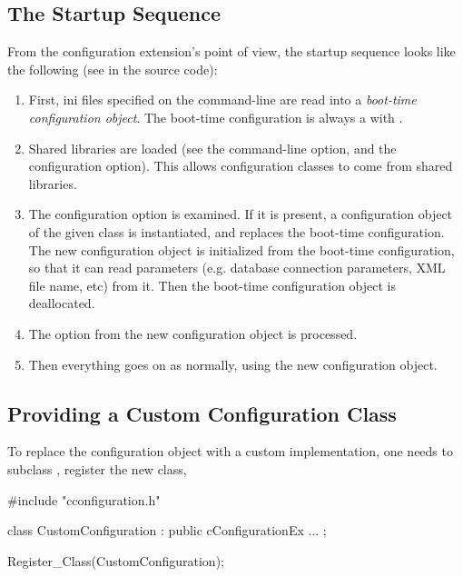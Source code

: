 \subsection{The Startup Sequence}
\label{sec:plugin-exts:configprovider-startup-sequence}

From the configuration extension's point of view, the startup sequence
looks like the following (see  in the source code):

\begin{enumerate}
  \item First, ini files specified on the command-line are read into a
     \textit{boot-time configuration object}. The boot-time configuration
     is always a  with
     .
  \item Shared libraries are loaded (see the  command-line option,
     and the  configuration option). This allows
     configuration classes to come from shared libraries.
  \item The  configuration option is examined.
     If it is present, a configuration object of the given class
     is instantiated, and replaces the boot-time configuration.
     The new configuration object is initialized from the boot-time
     configuration, so that it can read parameters (e.g. database
     connection parameters, XML file name, etc) from it.
     Then the boot-time configuration object is deallocated.
  \item The  option from the new configuration object is
     processed.
  \item Then everything goes on as normally, using the new configuration
     object.
\end{enumerate}

\subsection{Providing a Custom Configuration Class}
\label{sec:plugin-exts:configprovider:custom-class}

To replace the configuration object with a custom implementation,
one needs to subclass , register the new class,

\begin{cpp}
#include "cconfiguration.h"

class CustomConfiguration : public cConfigurationEx
{
   ...
};

Register_Class(CustomConfiguration);
\end{cpp}


